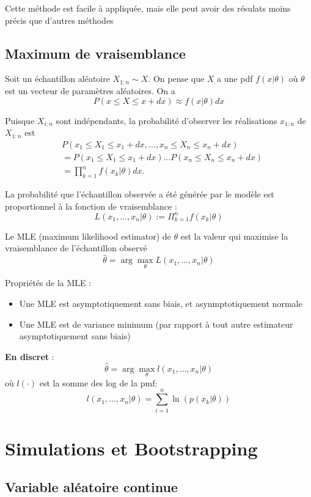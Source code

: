 \documentclass[12pt,a4paper]{article}
\begin{document}
Cette méthode est facile à appliquée, mais elle peut avoir des résulats moins précis que d'autres méthodes


\subsection{Maximum de vraisemblance}

Soit un échantillon aléatoire $X_{1:n} \sim X$. On pense que $X$ a une pdf $f(x|\theta)$ où $\theta$ est un vecteur de paramètres aléatoires. On a
$$P(x \leq X \leq x + dx) \approx f(x|\theta) dx$$

Puisque $X_{i:n}$ sont indépendants, la probabilité d'observer les réalisations $x_{1:n}$ de $X_{1:n}$ est
\begin{align*}
&P(x_1 \leq X_1 \leq x_1 + dx, \ldots, x_n \leq X_n \leq x_n + dx) \\
&= P(x_1 \leq X_1 \leq x_1 + dx) \ldots P(x_n \leq X_n \leq x_n + dx) \\
&= \prod_{k=1}^{n} f(x_k|\theta) dx .
\end{align*}

La probabilité que l'échantillon observée a été générée par le modèle est proportionnel à la fonction de vraisemblance :
$$L(x_1,\dots,x_n|\theta) := \Pi_{k=1}^n f(x_k|\theta)$$

Le MLE (maximum likelihood estimator) de $\theta$ est la valeur qui maximise la vraisemblance de l'échantillon observé
$$\hat{\theta} = \arg \max\limits_\theta L(x_1, \dots, x_n|\theta)$$

Propriétés de la MLE :
\begin{itemize}
    \item Une MLE est asymptotiquement sans biais, et asynmptotiquement normale
    \item Une MLE est de variance minimum (par rapport à tout autre estimateur asymptotiquement sans biais)
\end{itemize}

\textbf{En discret} :
$$\hat{\theta} = \arg \max\limits_{\theta} l(x_1,\dots,x_n|\theta)$$
où $l(\cdot)$ est la somme des log de la pmf:
$$l(x_1, \dots, x_n|\theta) = \sum_{i=1}^n \ln(p(x_k|\theta))$$


\section{Simulations et Bootstrapping}

\subsection{Variable aléatoire continue}
\end{document}
